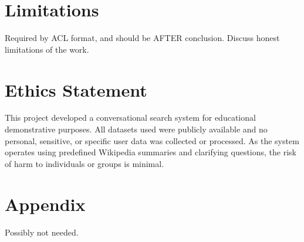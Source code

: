 \documentclass[11pt]{article}
\begin{document}
\section*{Limitations}
Required by ACL format, and should be AFTER conclusion.
Discuss honest limitations of the work.

\section*{Ethics Statement}
This project developed a conversational search system for educational demonstrative purposes. All datasets used were publicly available and no personal, sensitive, or specific user data was collected or processed. As the system operates using predefined Wikipedia summaries and clarifying questions, the risk of harm to individuals or groups is minimal. 




\appendix

\section{Appendix}
Possibly not needed.
\end{document}
